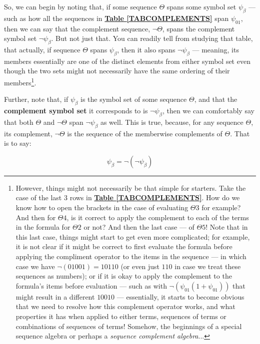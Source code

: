 \documentclass[a4paper, 18pt]{book} %
\begin{document}
So, we can begin by noting that, if some sequence $\Theta$ spans some symbol set $\psi_\beta$ --- such as how all the sequences in \textbf{\hyperref[TABCOMPLEMENTS]{Table \ref{TABCOMPLEMENTS}}} span $\psi_{01}$, then we can say that the complement sequence, $\lnot\Theta$, spans the complement symbol set $\lnot\psi_\beta$. But not just that. You can readily tell from studying that table, that actually, if sequence $\Theta$ spans $\psi_\beta$, then it also spans $\lnot\psi_\beta$ --- meaning, its members essentially are one of the distinct elements from either symbol set even though the two sets might not necessarily have the same ordering of their members\footnote{However, things might not necessarily be that simple for starters. Take the case of the last 3 rows in \textbf{\hyperref[TABCOMPLEMENTS]{Table \ref{TABCOMPLEMENTS}}}. How do we know how to open the brackets in the case of evaluating $\Theta3$ for example? And then for $\Theta4$, is it correct to apply the complement to each of the terms in the formula for $\Theta2$ or not? And then the last case --- of $\Theta5$! Note that in this last case, things might start to get even more complicated; for example, it is not clear if it might be correct to first evaluate the formula before applying the compliment operator to the items in the sequence --- in which case we have $\lnot(0 1 0 0 1) = 1 0 1 1 0$ (or even just $110$ in case we treat these sequences as numbers); or if it is okay to apply the complement to the formula's items before evaluation --- such as with $\lnot(\psi_{01}(1+\psi_{01}))$ that might result in a different $10010$ --- essentially, it starts to become obvious that we need to resolve how this complement operator works, and what properties it has when applied to either terms, sequences of terms or combinations of sequences of terms! Somehow, the beginnings of a special sequence algebra or perhaps a \textit{sequence complement algebra}...}.

Further, note that, if $\psi_\beta$ is the symbol set of some sequence $\Theta$, and that the \textbf{complement symbol set} it corresponds to is $\lnot\psi_\beta$, then we can comfortably say that both $\Theta$ and $\lnot\Theta$ span $\lnot\psi_\beta$ as well. This is true, because, for any sequence $\Theta$, its complement, $\lnot\Theta$ is the sequence of the memberwise complements of $\Theta$. That is to say:

\vspace{1em}

\begin{equation}
\psi_\beta = \lnot (\lnot \psi_\beta)
\end{equation}
\end{document}
